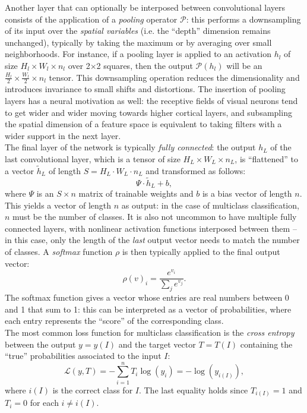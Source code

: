 \documentclass[11pt,oneside,reqno]{amsart}
\begin{document}
 Another layer that can optionally be interposed between convolutional layers consists of the application of a \emph{pooling} operator $\mathcal{P}$: this performs a downsampling of its input over the \emph{spatial variables} (i.e. the ``depth'' dimension remains unchanged), typically by taking the maximum or by averaging over small neighborhoods. For instance, if a pooling layer is applied to an activation $h_l$ of size $H_l\times W_l \times n_l$ over 2$\times$2 squares, then the output $\mathcal{P}(h_l)$ will be an $\frac{H_l}{2}\times \frac{W_l}{2} \times n_l$ tensor. This downsampling operation reduces the dimensionality and introduces invariance to small shifts and distortions. The insertion of pooling layers has a neural motivation as well: the receptive fields of visual neurons tend to get wider and wider moving towards higher cortical layers, and subsampling the spatial dimension of a feature space is equivalent to taking filters with a wider support in the next layer.\\
 The final layer of the network is typically \emph{fully connected}: the output $h_L$ of the last convolutional layer, which is a tensor of size $H_L \times W_L \times n_L$, is ``flattened'' to a vector $\tilde{h}_L$ of length $S = H_L \cdot W_L \cdot n_L$ and transformed as follows:
 \[\Psi\cdot\tilde{h}_L + b,\]
 where $\Psi$ is an $S \times n$ matrix of trainable weights and $b$ is a bias vector of length $n$. This yields a vector of length $n$ as output: in the case of multiclass classification, $n$ must be the number of classes. It is also not uncommon to have multiple fully connected layers, with nonlinear activation functions interposed between them -- in this case, only the length of the \emph{last} output vector needs to match the number of classes. A \emph{softmax} function $\rho$ is then typically applied to the final output vector:
 \[\rho(v)_i = \frac{e^{v_i}}{\sum_j e^{v_j}}.\]
 The softmax function gives a vector whose entries are real numbers between 0 and 1 that sum to 1: this can be interpreted as a vector of probabilities, where each entry represents the ``score'' of the corresponding class.\\
 The most common loss function for multiclass classification is the \emph{cross entropy} between the output $y = y(I)$ and the target vector $T = T(I)$ containing the ``true'' probabilities associated to the input $I$:
 \begin{equation}\label{loss} \mathcal{L}(y,T) = -\sum_{i=1}^{n} T_i \log(y_i) = - \log(y_{i(I)}),\end{equation}
 where $i(I)$ is the correct class for $I$. The last equality holds since $T_{i(I)} = 1$ and $T_i = 0$ for each $i\neq i(I)$.
\end{document}
